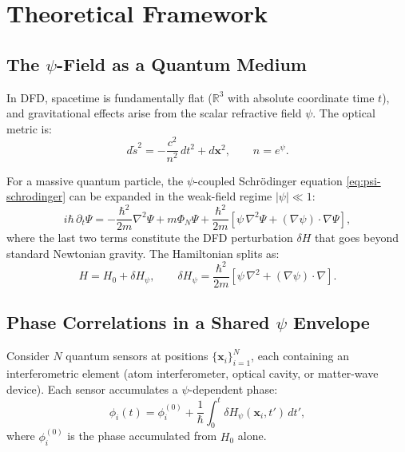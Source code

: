 \documentclass[12pt,a4paper]{article}
\theoremstyle{remark}
\begin{document}
\section{Theoretical Framework}\label{sec:theory}

\subsection{The $\psi$-Field as a Quantum Medium}\label{sec:psi-medium}

In DFD, spacetime is fundamentally flat ($\mathbb{R}^3$ with absolute
coordinate time $t$), and gravitational effects arise from the scalar
refractive field $\psi$. The optical metric is:
\begin{equation}
d\tilde{s}^2 = -\frac{c^2}{n^2}\,dt^2 + d\mathbf{x}^2, \qquad n = e^\psi.
\label{eq:optical-metric}
\end{equation}

For a massive quantum particle, the $\psi$-coupled Schr\"odinger equation
\eqref{eq:psi-schrodinger} can be expanded in the weak-field regime
$|\psi| \ll 1$:
\begin{equation}
i\hbar\,\partial_t\Psi = -\frac{\hbar^2}{2m}\nabla^2\Psi + m\Phi_N\Psi
+ \frac{\hbar^2}{2m}\left[\psi\,\nabla^2\Psi + (\nabla\psi)\cdot\nabla\Psi\right],
\label{eq:schro-expanded}
\end{equation}
where the last two terms constitute the DFD perturbation $\delta H$ that
goes beyond standard Newtonian gravity. The Hamiltonian splits as:
\begin{equation}
H = H_0 + \delta H_\psi, \qquad
\delta H_\psi = \frac{\hbar^2}{2m}\left[\psi\,\nabla^2 + (\nabla\psi)\cdot\nabla\right].
\label{eq:hamiltonian-split}
\end{equation}

\subsection{Phase Correlations in a Shared $\psi$ Envelope}\label{sec:phase-corr}

Consider $N$ quantum sensors at positions $\{\mathbf{x}_i\}_{i=1}^N$, each
containing an interferometric element (atom interferometer, optical cavity,
or matter-wave device). Each sensor accumulates a $\psi$-dependent phase:
\begin{equation}
\phi_i(t) = \phi_i^{(0)} + \frac{1}{\hbar}\int_0^t \delta H_\psi(\mathbf{x}_i, t')\,dt',
\label{eq:sensor-phase}
\end{equation}
where $\phi_i^{(0)}$ is the phase accumulated from $H_0$ alone.
\end{document}
